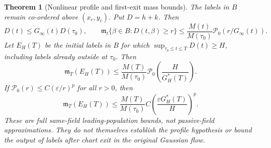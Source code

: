 \documentclass[11pt]{article}
\numberwithin{equation}{section}
\newtheorem{theorem}{Theorem}[section]
\theoremstyle{remark}\newtheorem{remark}[theorem]{Remark}
\newcommand{\1}{\mathbf 1}
\begin{document}
\begin{theorem}[Nonlinear profile and first-exit mass bounds]
\label{inc:AN02:tail:v1:profiletheorem}
The labels in $B$ remain co-ordered above $(x_c,y_c)$. Put $D=h+k$.
Then
\begin{equation}\label{inc:AN02:tail:v1:globalD}
 D(t)\le G_\infty(t)D(\tau_0),\qquad
 \mathfrak m_t\{\beta\in B:D(t,\beta)\ge r\}
 \le\frac{M(t)}{M(\tau_0)}\mathcal P_0(r/G_\infty(t)).
\end{equation}
Let $E_H(T)$ be the initial labels in $B$ for which
$\sup_{\tau_0\le t\le T}D(t)\ge H$, including labels already outside
at $\tau_0$. Then
\begin{equation}\label{inc:AN02:tail:v1:exitmass}
 \mathfrak m_T(E_H(T))
 \le\frac{M(T)}{M(\tau_0)}
 \mathcal P_0\left(\frac H{G_H^*(T)}\right).
\end{equation}
If $\mathcal P_0(r)\le C(\varepsilon/r)^p$ for all $r>0$, then
\begin{equation}\label{inc:AN02:tail:v1:powerexit}
 \mathfrak m_T(E_H(T))\le\frac{M(T)}{M(\tau_0)}
 C\left(\frac{\varepsilon G_H^*(T)}H\right)^p.
\end{equation}
These are full same-field leading-population bounds, not passive-field
approximations. They do not themselves establish the profile hypothesis or
bound the output of labels after chart exit in the original Gaussian flow.
\end{theorem}
\end{document}
